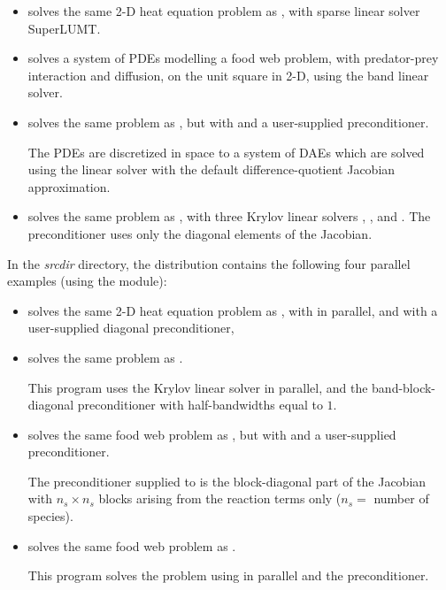 \begin{itemize}
\item {}
  solves the same 2-D heat equation problem as , with
  sparse linear solver SuperLUMT.

\item {}
  solves a system of PDEs modelling a food web problem, with predator-prey
  interaction and diffusion, on the unit square in 2-D, using the band
  linear solver.

\item {}
  solves the same problem as , but with {\idaspgmr}
  and a user-supplied preconditioner.

  The PDEs are discretized in space to a system of DAEs which are solved
  using the {\idaband} linear solver with the default difference-quotient 
  Jacobian approximation.

\item {}
  solves the same problem as , with three Krylov linear solvers
  {\idaspgmr}, {\idaspbcg}, and {\idasptfqmr}.  The preconditioner uses only
  the diagonal elements of the Jacobian.

\end{itemize}

\vspace{0.2in}\noindent
In the {\em srcdir} directory, the {\ida} 
distribution contains the following four parallel examples 
(using the {\nvecp} module):
\begin{itemize}

\item {}
  solves the same 2-D heat equation problem as , with {\idaspgmr}
  in parallel, and with a user-supplied diagonal preconditioner,
  
\item {}
  solves the same problem as .

  This program  uses the Krylov linear solver {\idaspgmr} in parallel, and the
  band-block-diagonal preconditioner {\idabbdpre} with half-bandwidths equal to $1$.

\item {}
  solves the same food web problem as , but with {\idaspgmr}
  and a user-supplied preconditioner.
  
  The preconditioner supplied to {\idaspgmr} is the block-diagonal part of 
  the Jacobian with $n_s \times n_s$ blocks arising from the reaction terms only
  ($n_s =$ number of species).

\item {}
  solves the same food web problem as .

  This program solves the problem using {\idaspgmr} in parallel and the
  {\idabbdpre} preconditioner.

\end{itemize}

